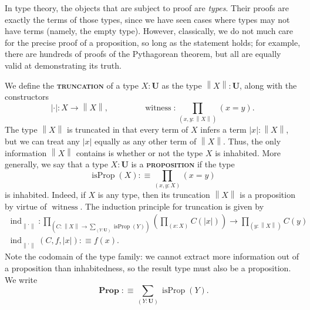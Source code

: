 \documentclass{article}
\newcommand{\defn}[1]{{\scshape\bfseries\color{MPBemph}#1}}
\newcommand{\eql}{\mathbin{:\equiv}}
\newcommand{\U}{\mathbf{U}}
\newcommand{\tpi}[1]{\prod_{(#1)}}
\newcommand{\tsigma}[1]{\sum_{(#1)}}
\DeclareMathOperator{\ind}{ind}
\newcommand{\1}{\textbf{1}}
\newcommand{\0}{\mathbf{0}}
\newcommand{\2}{\textbf{2}}
\newcommand{\abs}[1][\cdot]{\left|#1\right|}
\newcommand{\norm}[1][\cdot]{\left\|#1\right\|}
\DeclareMathOperator{\witness}{witness}
\DeclareMathOperator{\isProp}{isProp}
\DeclareMathOperator{\Prop}{\textbf{Prop}}
\begin{document}
In type theory, the objects that are subject to proof are \emph{types}. Their proofs are exactly the terms of those types, since we have seen cases where types may not have terms (namely, the empty type). However, classically, we do not much care for the precise proof of a proposition, so long as the statement holds; for example, there are hundreds of proofs of the Pythagorean theorem, but all are equally valid at demonstrating its truth.

We define the \defn{truncation} of a type \( X : \U \) as the type \( \norm[X] : \U \), along with the constructors
\[ \abs : X \to \norm[X], \hspace{50pt} \witness : \tpi{x, y : \norm[X]} (x = y). \]
The type \( \norm[X] \) is truncated in that every term of \( X \) infers a term \( \abs[x] : \norm[X] \), but we can treat any \( \abs[x] \) equally as any other term of \( \norm[X] \). Thus, the only information \( \norm[X] \) contains is whether or not the type \( X \) is inhabited. More generally, we say that a type \( X : \U \) is a \defn{proposition} if the type
\[ \isProp(X) \eql \tpi{x, y : X} (x = y) \]
is inhabited. Indeed, if \( X \) is any type, then its truncation \( \norm[X] \) is a proposition by virtue of \( \witness \). The induction principle for truncation is given by
\[ \begin{array}{c}
	\ind_{\norm} : \tpi{C : \norm[X] \to \tsigma{Y : \U} \isProp(Y)} (\tpi{x : X} C(\abs[x])) \to \tpi{y : \norm[X]} C(y) \\[3pt]
	\ind_{\norm}(C, f, \abs[x]) \eql f(x).
\end{array} \]
Note the codomain of the type family: we cannot extract more information out of a proposition than inhabitedness, so the result type must also be a proposition. We write
\[ {\Prop} \eql \tsigma{Y : \U} \isProp(Y). \]
\end{document}
